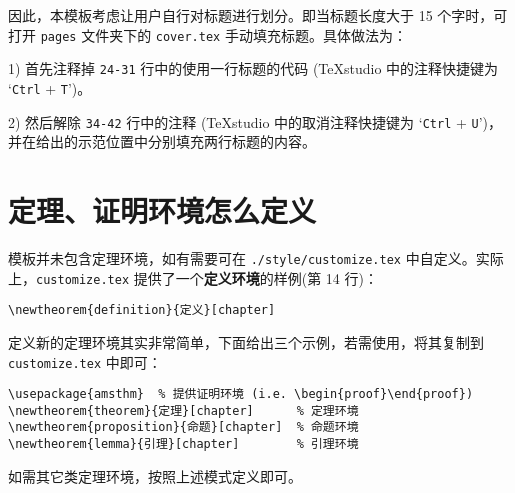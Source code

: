因此，本模板考虑让用户自行对标题进行划分。即当标题长度大于 15 个字时，可打开 \texttt{pages} 文件夹下的 \texttt{cover.tex} 手动填充标题。具体做法为：

1) 首先注释掉 \texttt{24-31} 行中的使用一行标题的代码 (TeXstudio 中的注释快捷键为 `\texttt{Ctrl} + \texttt{T}')。

2) 然后解除 \texttt{34-42} 行中的注释 (TeXstudio 中的取消注释快捷键为 `\texttt{Ctrl} + \texttt{U}')，并在给出的示范位置中分别填充两行标题的内容。

\section{定理、证明环境怎么定义}

模板并未包含定理环境，如有需要可在 \texttt{./style/customize.tex} 中自定义。实际上，\texttt{customize.tex} 提供了一个\textbf{定义环境}的样例(第 14 行)：
\begin{verbatim}
\newtheorem{definition}{定义}[chapter]
\end{verbatim}

定义新的定理环境其实非常简单，下面给出三个示例，若需使用，将其复制到 \texttt{customize.tex} 中即可：

\begin{verbatim}
\usepackage{amsthm}  % 提供证明环境 (i.e. \begin{proof}\end{proof})
\newtheorem{theorem}{定理}[chapter]      % 定理环境
\newtheorem{proposition}{命题}[chapter]  % 命题环境
\newtheorem{lemma}{引理}[chapter]        % 引理环境
\end{verbatim}

如需其它类定理环境，按照上述模式定义即可。
